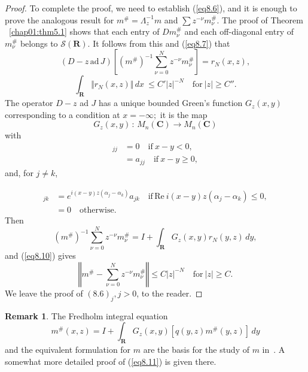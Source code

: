 \documentclass{surv-l}
\theoremstyle{plain}
\theoremstyle{definition}
\newtheorem{remark}[theorem]{Remark}
\numberwithin{equation}{chapter}
\begin{document}
\begin{proof}
To complete the proof, we need to establish (\ref{eq8.6}), and it is enough to prove the analogous result for $m^{\#}=\Lambda_{z}^{-1}m$ and $\displaystyle \sum z^{-\nu}m_{\nu}^{\#}$. The proof of Theorem ~\ref{chap01:thm5.1} shows that each entry of $Dm_{\nu}^{\#}$ and each off-diagonal entry of $ m_{\nu}^{\#}$ belongs to $\mathscr{S}(\mathbf{R})$. It follows from this and (\ref{eq8.7}) that
\begin{equation}\label{eq8.9}
(D-z\, \mathrm{ad}\, J)\left[(m^{\#})^{-1}\sum_{\nu=0}^{N}z^{-\nu}m_{\nu}^{\#}\right]=r_{N}(x, z),
\end{equation}
\begin{equation}\label{eq8.10}
\int_{\mathbf{R}}\Vert r_{N}(x, z)\Vert\, dx\ \leq C'|z|^{-N}\quad \mathrm{for}\ |z|\geq C''.
\end{equation}
The operator $D-z$ ad $J$ has a unique bounded Green's function $G_{z}(x, y)$ corresponding to a condition at $x=-\infty;$ it is the map
\begin{equation*}
G_{z}(x, y)\, :\, M_{n}(\mathbf{C})\rightarrow M_{n}(\mathbf{C})
\end{equation*}
with
\begin{align*}
[G_{z}(x, y)a]_{jj}&=0\quad \mathrm{if}\ x-y<0,\\
&=a_{jj}\quad \mathrm{if}\  x-y\geq 0,
\end{align*}
and, for $j\neq k$,

\begin{align*}
[G_{z}(x, y)a]_{jk}&=e^{i(x-y)z(\alpha_{j}-\alpha_{k})}a_{jk}\quad \mathrm{if}\, \mathrm{Re}\ i(x-y)z(\alpha_{j}-\alpha_{k})\leq 0,\\
&=0\quad \mathrm{otherwise}.
\end{align*}
Then
\begin{equation*}
(m^{\#})^{-1}\sum_{\nu=0}^{N}z^{-\nu}m_{\nu}^{\#}=I+\int_{\mathbf{R}}G_{z}(x, y)r_{N}(y, z)\, dy,
\end{equation*}
and (\ref{eq8.10}) gives
\begin{equation}\label{eq8.11}
\left\Vert m^{\#}-\sum_{\nu=0}^{N}z^{-\nu}m_{\nu}^{\#}\right\Vert\leq C|z|^{-N}\quad \mathrm{for}\ |z|\geq C.
\end{equation}
We leave the proof of $(8.6)_{j}, j>0$, to the reader.
\end{proof}
\setcounter{theorem}{11}
\begin{remark}\label{rem8.12}
The Fredholm integral equation
\setcounter{equation}{12}
\begin{equation}\label{eq8.13}
m^{\#}(x,z)=I+\displaystyle \int_{\mathbf{R}}G_{z}(x, y)[q(y, z)m^{\#}(y, z)]\,dy
\end{equation}
and the equivalent formulation for $m$ are the basis for the study of $m$ in~\cite{Be}. A somewhat more detailed proof of (\ref{eq8.11}) is given there.
\end{remark}
\end{document}
